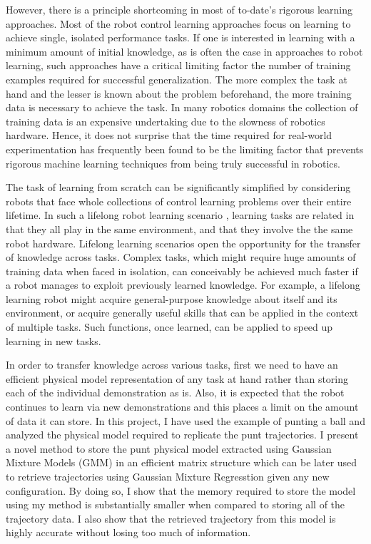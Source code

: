 \documentclass[conference]{IEEEtran}
\begin{document}
However, there is a principle shortcoming in most of to-date's rigorous learning approaches. Most of the robot control learning approaches focus on learning to achieve single, isolated performance tasks. If one is interested in learning with a minimum amount of initial knowledge, as is often the case in approaches to robot learning, such approaches have a critical limiting factor the number of training examples required for successful generalization. The more complex the task at hand and the lesser is known about the problem beforehand, the more training data is necessary to achieve the task. In many robotics domains the collection of training data is an expensive undertaking due to the slowness of robotics hardware. Hence, it does not surprise that the time required for real-world experimentation has frequently been found to be the limiting factor that prevents rigorous machine learning techniques from being truly successful in robotics. 

The task of learning from scratch can be significantly simplified by considering robots that face whole collections of control learning problems over their entire lifetime. In such a lifelong robot learning scenario \cite{ref:5, ref:6}, learning tasks are related in that they all play in the same environment, and that they involve the the same robot hardware. Lifelong learning scenarios open the opportunity for the transfer of knowledge across tasks. Complex tasks, which might require huge amounts of training data when faced in isolation, can conceivably be achieved much faster if a robot manages to exploit previously learned knowledge. For example, a lifelong learning robot might acquire general-purpose knowledge about itself and its environment, or acquire generally useful skills that can be applied in the context of multiple tasks. Such functions, once learned, can be applied to speed up learning in new tasks. 

In order to transfer knowledge across various tasks, first we need to have an efficient physical model representation of any task at hand rather than storing each of the individual demonstration as is. Also, it is expected that the robot continues to learn via new demonstrations and this places a limit on the amount of data it can store. In this project, I have used the example of punting a ball and analyzed the physical model required to replicate the punt trajectories. I present a novel method to store the punt physical model extracted using Gaussian Mixture Models (GMM) in an efficient matrix structure which can be later used to retrieve trajectories using Gaussian Mixture Regresstion given any new configuration. By doing so, I show that the memory required to store the model using my method is substantially smaller when compared to storing all of the trajectory data. I also show that the retrieved trajectory from this model is highly accurate without losing too much of information.
\end{document}
